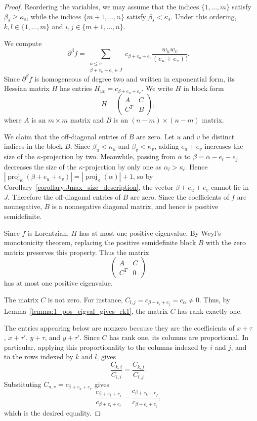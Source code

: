 \documentclass[11pt]{article}
\theoremstyle{definition}
\theoremstyle{remark}
\DeclareMathOperator{\proj}{proj}              %
\newcommand{\kproj}{\proj_{\kappa}}            %
\begin{document}
\begin{proof}
    Reordering the variables, we may assume that the indices $\{1,\dots,m\}$ satisfy $\beta_s\geq\kappa_s$, while the indices $\{m+1,\dots,n\}$ satisfy $\beta_s<\kappa_s$. Under this ordering, $k,l\in\{1,\dots,m\}$ and $i,j\in\{m+1,\dots,n\}$.

    We compute
    \[
        \partial^\beta f
        =
        \sum_{\substack{u\leq v\\ \beta+e_u+e_v\in J}}
        c_{\beta+e_u+e_v}
        \frac{w_uw_v}{(e_u+e_v)!}.
    \]
    Since $\partial^\beta f$ is homogeneous of degree two and written in exponential form, its Hessian matrix $H$ has entries $H_{uv}=c_{\beta+e_u+e_v}$. We write $H$ in block form
    \[
        H=
        \begin{pmatrix}
            A & C \\
            C^T & B
        \end{pmatrix},
    \]
    where $A$ is an $m\times m$ matrix and $B$ is an $(n-m)\times(n-m)$ matrix.

    We claim that the off-diagonal entries of $B$ are zero. Let $u$ and $v$ be distinct indices in the block $B$. Since $\beta_u<\kappa_u$ and $\beta_v<\kappa_v$, adding $e_u+e_v$ increases the size of the $\kappa$-projection by two. Meanwhile, passing from $\alpha$ to $\beta=\alpha-e_l-e_j$ decreases the size of the $\kappa$-projection by only one as $\alpha_l > \kappa_l$. Hence $|\kproj(\beta+e_u+e_v)|=|\kproj(\alpha)|+1$, so by Corollary~\ref{corollary:Jmax_size_description}, the vector $\beta+e_u+e_v$ cannot lie in $J$. Therefore the off-diagonal entries of $B$ are zero. Since the coefficients of $f$ are nonnegative, $B$ is a nonnegative diagonal matrix, and hence is positive semidefinite.

    Since $f$ is Lorentzian, $H$ has at most one positive eigenvalue. By Weyl's monotonicity theorem, replacing the positive semidefinite block $B$ with the zero matrix preserves this property. Thus the matrix
    \[
        \begin{pmatrix}
            A & C \\
            C^T & 0
        \end{pmatrix}
    \]
    has at most one positive eigenvalue.

    The matrix $C$ is not zero. For instance, $C_{l,j}=c_{\beta+e_l+e_j}=c_\alpha\neq 0$. Thus, by Lemma~\ref{lemma:1_pos_eigval_gives_rk1}, the matrix $C$ has rank exactly one.

    The entries appearing below are nonzero because they are the coefficients of $x+\tau$, $x+\tau'$, $y+\tau$, and $y+\tau'$. Since $C$ has rank one, its columns are proportional. In particular, applying this proportionality to the columns indexed by $i$ and $j$, and to the rows indexed by $k$ and $l$, gives
    \[
        \frac{C_{k,i}}{C_{l,i}}
        =
        \frac{C_{k,j}}{C_{l,j}}.
    \]
    Substituting $C_{u,v}=c_{\beta+e_u+e_v}$ gives
    \[
        \frac{c_{\beta+e_k+e_i}}{c_{\beta+e_l+e_i}}
        =
        \frac{c_{\beta+e_k+e_j}}{c_{\beta+e_l+e_j}},
    \]
    which is the desired equality.
\end{proof}
\end{document}
